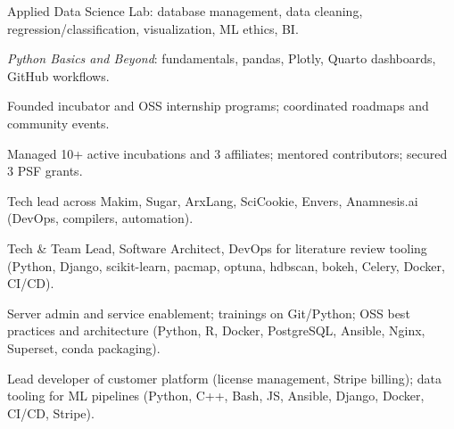 \documentclass[10pt,a4paper]{article}
\begin{document}
\begin{tightitemize}
  \item Applied Data Science Lab: database management, data cleaning, regression/classification, visualization, ML ethics, BI.
\end{tightitemize}

\begin{tightitemize}
  \item \emph{Python Basics and Beyond}: fundamentals, pandas, Plotly, Quarto dashboards, GitHub workflows.
\end{tightitemize}

\begin{tightitemize}
  \item Founded incubator and OSS internship programs; coordinated roadmaps and community events.
  \item Managed 10+ active incubations and 3 affiliates; mentored contributors; secured 3 PSF grants.
  \item Tech lead across Makim, Sugar, ArxLang, SciCookie, Envers, Anamnesis.ai (DevOps, compilers, automation).
\end{tightitemize}

\begin{tightitemize}
  \item Tech \& Team Lead, Software Architect, DevOps for literature review tooling (Python, Django, scikit-learn, pacmap, optuna,
        hdbscan, bokeh, Celery, Docker, CI/CD).
\end{tightitemize}

\begin{tightitemize}
  \item Server admin and service enablement; trainings on Git/Python; OSS best practices and architecture
        (Python, R, Docker, PostgreSQL, Ansible, Nginx, Superset, conda packaging).
\end{tightitemize}

\begin{tightitemize}
  \item Lead developer of customer platform (license management, Stripe billing); data tooling for ML pipelines
        (Python, C++, Bash, JS, Ansible, Django, Docker, CI/CD, Stripe).
\end{tightitemize}
\end{document}
